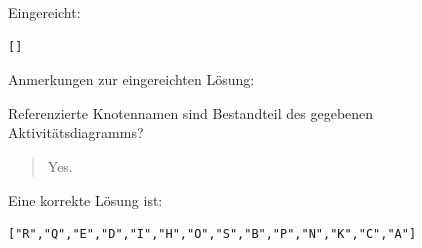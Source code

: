 Eingereicht:


\begin{verbatim}
[]
\end{verbatim}


Anmerkungen zur eingereichten Lösung:

Referenzierte Knotennamen sind Bestandteil des gegebenen Aktivitätsdiagramms?\begin{quote}Yes.\end{quote}Eine korrekte Lösung ist:
\begin{verbatim}
["R","Q","E","D","I","H","O","S","B","P","N","K","C","A"]
\end{verbatim}


